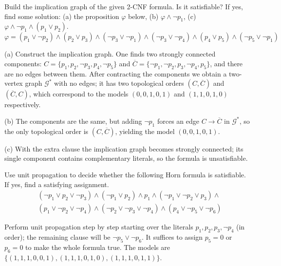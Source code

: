 \begin{problem} \label{problem:2sat}
    
    Build the implication graph of the given 2-CNF formula. Is it satisfiable? If yes, find some solution: (a) the proposition $\varphi$ below, (b) $\varphi\land\neg p_1$, (c) $\varphi\land\neg p_1\land(p_1\lor p_2)$.
    $$
    \varphi=(p_1\vee \neg p_2)\wedge (p_2\vee p_3)\wedge (\neg p_3\vee \neg p_1)\wedge (\neg p_3\vee \neg p_4)\wedge (p_4\vee p_5)\wedge (\neg p_5\vee \neg p_1)
    $$

    \begin{solution}
        (a) Construct the implication graph. One finds two strongly connected components: $C=\{p_1,p_2,\neg p_3,p_4,\neg p_5\}$ and $\overline{C}=\{\neg p_1,\neg p_2,p_3,\neg p_4,p_5\}$, and there are no edges between them. After contracting the components we obtain a two-vertex graph $\mathcal G^*$ with no edges; it has two topological orders $(C,\overline{C})$ and $(\overline{C},C)$, which correspond to the models $(0,0,1,0,1)$ and $(1,1,0,1,0)$ respectively.
        
        (b) The components are the same, but adding $\neg p_1$ forces an edge $C\to\overline{C}$ in $\mathcal G^*$, so the only topological order is $(C,\overline{C})$, yielding the model $(0,0,1,0,1)$.

        (c) With the extra clause the implication graph becomes strongly connected; its single component contains complementary literals, so the formula is unsatisfiable.
    \end{solution}

\end{problem}


\begin{problem}

    Use unit propagation to decide whether the following Horn formula is satisfiable. If yes, find a satisfying assignment.
    \begin{align*}
        &(\neg p_1 \vee p_2 \vee \neg p_3)\wedge(\neg p_1 \vee p_2)\wedge p_1 \wedge (\neg p_1 \vee \neg p_2 \vee p_3)\wedge \\
        &(p_1\vee\neg p_2 \vee \neg p_4)\wedge(\neg p_2 \vee \neg p_3 \vee \neg p_4)\wedge(p_4\vee \neg p_5 \vee\neg p_6)
    \end{align*}

    \begin{solution}
        Perform unit propagation step by step starting over the literals $p_1,p_2,p_3,\neg p_4$ (in order); the remaining clause will be $\neg p_5\lor\neg p_6$. It suffices to assign $p_5=0$ or $p_6=0$ to make the whole formula true. The models are $\{(1,1,1,0,0,1),(1,1,1,0,1,0),(1,1,1,0,1,1)\}$.
    \end{solution}
    
\end{problem}


